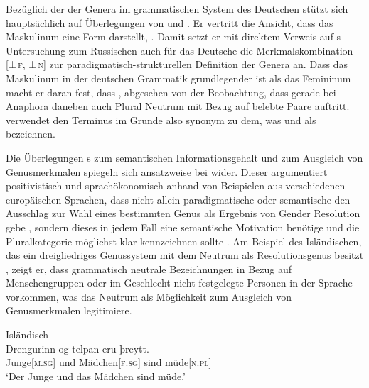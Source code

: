 Bezüglich der  der Genera im grammatischen System des
Deutschen stützt sich \citet{askedal1973} hauptsächlich auf
Überlegungen von \citet{jakobson1932} und \citet{bierwisch1967}. Er vertritt
die Ansicht, dass das Maskulinum eine  Form darstellt,
. Damit setzt er mit
direktem Verweis auf \citeauthor{jakobson1932}s Untersuchung zum
Russischen auch für das Deutsche die Merkmalskombination
[\textsc{±\,f, ±\,n}] zur paradigmatisch-struktu\-rellen Definition der Genera
an. Dass das Maskulinum in der deutschen Grammatik grundlegender ist als das
Femininum macht er daran fest, dass ,
abgesehen von der Beobachtung, dass gerade bei Anaphora daneben auch Plural
Neutrum mit Bezug auf belebte Paare auftritt. \citet{askedal1973}
verwendet den Terminus  im Grunde also synonym zu dem, was
\citet[205--218]{corbett1991} und \citet{wechsler2009} als 
bezeichnen.

Die Überlegungen \citeauthor{askedal1973}s zum semantischen Informationsgehalt
und zum Ausgleich von Genusmerkmalen spiegeln sich ansatzweise bei
\citet{corbett1991} wider. Dieser argumentiert positivistisch und
sprachökonomisch anhand von Beispielen aus verschiedenen europäischen Sprachen,
dass nicht allein paradigmatische oder semantische  den
Ausschlag zur Wahl eines bestimmten Genus als Ergebnis von Gender Resolution
gebe \autocite[290--293]{corbett1991}, sondern dieses  in
jedem Fall eine semantische Motivation benötige und die Plural\-kategorie
möglichst klar kennzeichnen sollte \autocite[293--299]{corbett1991}. Am
Beispiel des Isländischen, das ein dreigliedriges Genussystem
mit dem Neutrum als Resolutionsgenus besitzt , zeigt er,
dass grammatisch neutrale Bezeichnungen in Bezug auf Menschen\-gruppen oder im
Geschlecht nicht festgelegte Personen in der Sprache vorkommen, was das Neutrum
als Möglichkeit zum Ausgleich von Genusmerkmalen legiti\-miere.

\begin{exe}
\ex \label{ex:icelgendres}
	\langinfo%
		{Isländisch}%
		{}
		{\cites[nach][283]{corbett1991}[569]{wechsler2009}}\\
	\gll Drengurinn og telpan eru þreytt. \\
		Junge[\textsc{m.sg}] und Mädchen[\textsc{f.sg}] sind
		müde[\textsc{n.pl}] \\
	\trans `Der Junge und das Mädchen sind müde.'
\end{exe}

